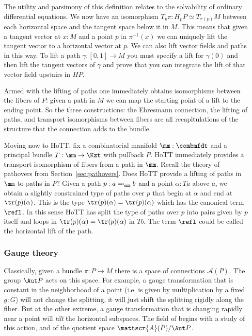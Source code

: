 The utility and parsimony of this definition relates to the solvability of ordinary differential equations. We now have an isomorphism \( T_p\pi:H_pP\simeq T_{\pi(p)}M \) between each horizontal space and the tangent space below it in \( M \). This means that given a tangent vector at \( x:M \) and a point \( p \) in \( \pi^{-1}(x) \) we can uniquely lift the tangent vector to a horizontal vector at \( p \). We can also lift vector fields and paths in this way. To lift a path \( \gamma:[0,1]\to M \) you must specify a lift for \( \gamma(0) \) and then lift the tangent vectors of \( \gamma \) and prove that you can integrate the lift of that vector field upstairs in \( HP \).

Armed with the lifting of paths one immediately obtains isomorphisms between the fibers of \( P \): given a path in \( M \) we can map the starting point of a lift to the ending point. So the three constructions: the Ehresmann connection, the lifting of paths, and transport isomorphisms between fibers are all recapitulations of the structure that the connection adds to the bundle.

Moving now to HoTT, fix a combinatorial manifold \( \mm:\combmfdt \) and a principal bundle \( T:\mm\to\Kzt \) with pullback \( P \). HoTT immediately provides a transport isomorphism of fibers from a path in \( \mm \). Recall the theory of pathovers from Section~\ref{sec:pathovers}. Does HoTT provide a lifting of paths in \( \mm \) to paths in \( P \)? Given a path \( p:a=_\mm b \) and a point \( \alpha:Ta \) above \( a \), we obtain a slightly constrained type of paths over \( p \) that begin at \( \alpha \) and end at \( \tr(p)(\alpha) \). This is the type \( \tr(p)(\alpha)=\tr(p)(\alpha) \) which has the canonical term \( \refl \). In this sense HoTT has split the type of paths over \( p \) into pairs given by \( p \) itself and loops in \( \tr(p)(\alpha)=\tr(p)(\alpha) \) in \( Tb \). The term \( \refl \) could be called the horizontal lift of the path.

\subsubsection{Gauge theory}

Classically, given a bundle \( \pi:P\to M \) there is a space of connections \( \mathscr{A}(P) \). The group \( \Aut P \) acts on this space. For example, a gauge transformation that is constant in the neighborhood of a point (i.e. is given by multiplication by a fixed \( g:G \)) will not change the splitting, it will just shift the splitting rigidly along the fiber. But at the other extreme, a gauge transformation that is changing rapidly near a point will \emph{tilt} the horizontal subspaces. The field of  begins with a study of this action, and of the quotient space \( \mathscr{A}(P)/\Aut P \).


